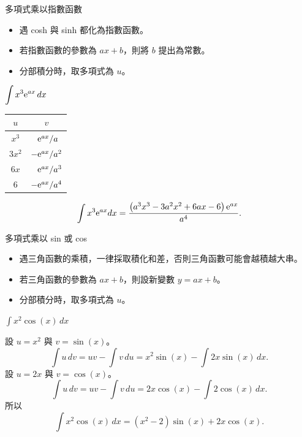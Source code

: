 \documentclass{beamer}
\newcommand{\e}{\textup e}
\theoremstyle{remark}
\begin{document}
\begin{frame}{多項式乘以指數函數}
  \begin{itemize}
    \item 遇 cosh 與 sinh 都化為指數函數。
    \item 若指數函數的參數為 $ax+b$，則將 $b$ 提出為常數。
    \item 分部積分時，取多項式為 $u$。
  \end{itemize}
\end{frame}

\begin{frame}{$\displaystyle \int x^3 \e^{ax}\,dx$}
  \begin{solution}
    \begin{center}
      \begin{tabular}{cc}
	$u$  & $v$\\
	\hline
	$x^3$ & $\phantom+\e^{ax}/a^{\phantom1}$\\
	$3x^2$& $        -\e^{ax}/a^2$\\
	$6x$  & $\phantom+\e^{ax}/a^3$\\
	6     & $        -\e^{ax}/a^4$
      \end{tabular}
    \end{center}
    \[\int x^3 \e^{ax} dx = \frac{\left( a^3 x^3 - 3a^2 x^2 + 6ax - 6 \right) \e^{ax}}{a^4}.\]
  \end{solution}
\end{frame}

\begin{frame}{多項式乘以 sin 或 cos}
  \begin{itemize}
    \item 遇三角函數的乘積，一律採取積化和差，否則三角函數可能會越積越大串。
    \item 若三角函數的參數為 $ax+b$，則設新變數 $y = ax+b$。
    \item 分部積分時，取多項式為 $u$。
  \end{itemize}
\end{frame}

\begin{frame}{$\displaystyle \int x^2 \cos(x)\,dx$}
  \begin{solution}
    設 $u = x^2$ 與 $v = \sin(x)$。
    \[\int u\,dv = uv - \int v\,du = x^2 \sin(x) - \int 2x \sin(x)\,dx.\]
    設 $u = 2x$ 與 $v = \cos(x)$。
    \[\int u\,dv = uv - \int v\,du = 2x \cos(x) - \int 2\cos(x)\,dx.\]
    所以
    \[\int x^2 \cos(x)\,dx = \left( x^2 - 2 \right) \sin(x) + 2x \cos(x).\]
  \end{solution}
\end{frame}
\end{document}
